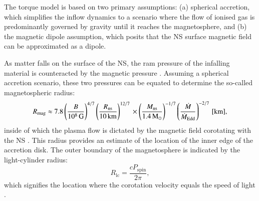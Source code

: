 \documentclass[main.tex]{subfiles}
\begin{document}
        The torque model is based on two primary assumptions: (a) spherical accretion, which simplifies the inflow dynamics to a scenario where the flow of ionised gas is predominantly governed by gravity until it reaches the magnetosphere,
        and (b) the magnetic dipole assumption, which posits that the NS surface magnetic field can be approximated as a dipole.
        
        As matter falls on the surface of the NS, the ram pressure of the infalling material is counteracted by the magnetic pressure \citep[e.g.,][]{1996ApJ...457L..31C}. Assuming a spherical accretion scenario, these two pressures can be equated to determine the so-called magnetospheric radius: 
        \begin{equation}
            \label{eq:rmag}
            R_\mathrm{mag} \approx 7.8 \left(\frac{B}{10^8\,\mathrm{G}}\right)^{4/7} \left(\frac{R_\mathrm{ns}}{10\,\mathrm{km}}\right)^{12/7} \\ \times \left(\frac{M_\mathrm{ns}}{1.4\mathrm{\,M_\odot}}\right)^{-1/7} \left(\frac{\dot{M}}{\dot{M}_\mathrm{Edd}}\right)^{-2/7}\,[\mathrm{km}],
        \end{equation}
        inside of which the plasma flow is dictated by the magnetic field corotating with the NS \citep{10.1111/j.1365-2966.2005.09167.x}. This radius provides an estimate of the location of the inner edge of the accretion disk. The outer boundary of the magnetosphere is indicated by the light-cylinder radius:
        \begin{equation}
            \label{eq:rlc}
            R_\mathrm{lc} = \frac{cP_\mathrm{spin}}{2\pi},
        \end{equation}
        which signifies the location where the corotation velocity equals the speed of light \citep[e.g.,][and references therein]{2004ApJ...606..436R, Tauris:sc2012, 2017ApJ...835....4B}. 
        
\end{document}
